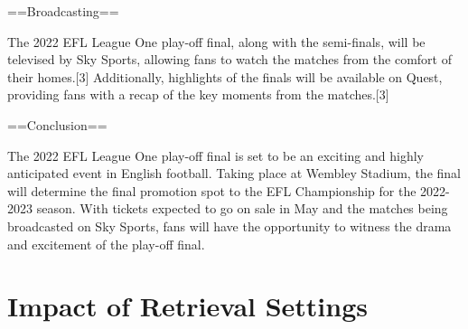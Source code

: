 \begin{tcolorbox}[title = {An example of model output}]
\begin{center}==Broadcasting==\end{center}
The 2022 EFL League One play-off final, along with the semi-finals, will be televised by Sky Sports, allowing fans to watch the matches from the comfort of their homes.[3] Additionally, highlights of the finals will be available on Quest, providing fans with a recap of the key moments from the matches.[3]

\begin{center}==Conclusion==\end{center}
The 2022 EFL League One play-off final is set to be an exciting and highly anticipated event in English football. Taking place at Wembley Stadium, the final will determine the final promotion spot to the EFL Championship for the 2022-2023 season. With tickets expected to go on sale in May and the matches being broadcasted on Sky Sports, fans will have the opportunity to witness the drama and excitement of the play-off final.


\end{tcolorbox}



\newpage
\section{Impact of Retrieval Settings}

